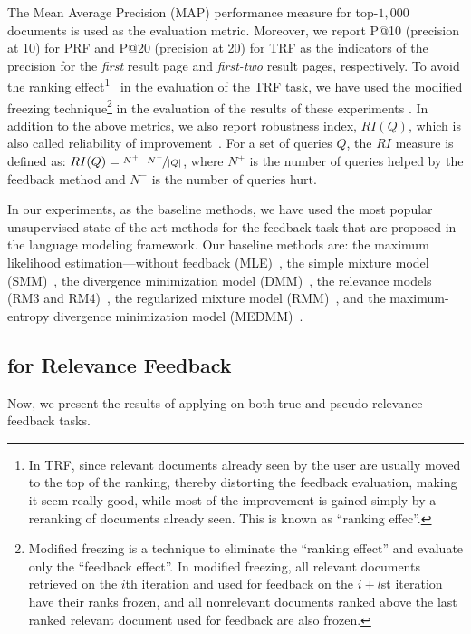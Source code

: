 %
The Mean Average Precision (MAP) performance measure for top-$1,000$ documents is used as the evaluation metric. 
Moreover, we report P@10 (precision at 10) for PRF and P@20 (precision at 20) for TRF as the indicators of the precision for the \emph{first} result page and \emph{first-two} result pages, respectively.  
To avoid the ranking effect\footnote{In TRF, since relevant documents already seen by the user are usually moved to the top of the ranking, thereby distorting the feedback evaluation, making it seem really good, while most of the improvement is gained simply by a reranking of documents already seen. This is known as ``ranking effec''.}~\citep{cirillo:1969} in the evaluation of the TRF task, we have used the modified freezing technique\footnote{Modified freezing is a technique to eliminate the ``ranking effect'' and evaluate only the ``feedback effect''. In modified freezing, all relevant documents retrieved on the $i$th iteration and used for feedback on the $i+l$st iteration have their ranks frozen, and all nonrelevant documents ranked above the last ranked relevant document used for feedback are also frozen.} 
in the evaluation of the results of these experiments \citep{Harman:1992,Ruthven:2003}. In addition to the above metrics, we also report robustness index, $RI(Q)$, which is also called reliability of improvement~\citep{Collins-Thompson:2007}. For a set of
queries $Q$, the $RI$ measure is defined as: $RI(Q) = \nicefrac{N^+ - N^-}{|Q|}$, where $N^+$ is the number of queries helped by the feedback method and $N^-$ is the number of queries hurt.

In our experiments, as the baseline methods, we have used the most popular unsupervised state-of-the-art methods for the feedback task that are proposed in the language modeling framework. 
Our baseline methods are: the maximum likelihood estimation---without feedback (MLE)~\citep{Lafferty:2001}, the simple mixture model (SMM)~\citep{Zhai:SMM:2001},  the divergence minimization model (DMM)~\citep{Zhai:SMM:2001}, the relevance models (RM3 and RM4)~\citep{Abdul-jaleel:2004,Lavrenko:2001}, the regularized mixture model (RMM)~\citep{Tao:2006}, and the maximum-entropy divergence minimization model (MEDMM)~\citep{Lv:2014}. 


\subsection{\acswlm for Relevance Feedback}
Now, we present the results of applying \acswlm on both true and pseudo relevance feedback tasks.

